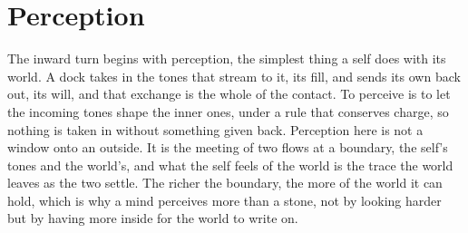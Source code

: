 \section{Perception}

The inward turn begins with perception, the simplest thing a self does with its world. A dock takes in the tones that stream to it, its fill, and sends its own back out, its will, and that exchange is the whole of the contact. To perceive is to let the incoming tones shape the inner ones, under a rule that conserves charge, so nothing is taken in without something given back. Perception here is not a window onto an outside. It is the meeting of two flows at a boundary, the self's tones and the world's, and what the self feels of the world is the trace the world leaves as the two settle. The richer the boundary, the more of the world it can hold, which is why a mind perceives more than a stone, not by looking harder but by having more inside for the world to write on.
